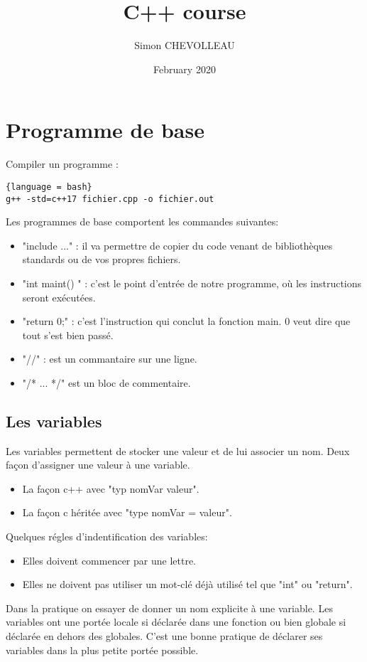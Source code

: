 \documentclass{article}
\title{C++ course}
\author{Simon CHEVOLLEAU }
\date{February 2020}
\begin{document}
\maketitle
\tableofcontents



\section{Programme de base}
Compiler un programme :
\begin{lstlisting}{language = bash}
g++ -std=c++17 fichier.cpp -o fichier.out
\end{lstlisting}

Les programmes de base comportent les commandes suivantes:
\begin{itemize}
    \item "include ..." : il va permettre de copier du code venant de bibliothèques standards ou de vos propres fichiers.
    \item "int maint() {}" : c'est le point d'entrée de notre programme, où les instructions seront exécutées.
    \item "return 0;" : c'est l'instruction qui conclut la fonction main. 0 veut dire que tout s'est bien passé.
    \item "//" : est un commantaire sur une ligne.
    \item "/* ... */" est un bloc de commentaire.
\end{itemize}{}
\subsection{Les variables}
Les variables permettent de stocker une valeur et de lui associer un nom. Deux façon d'assigner une valeur à une variable.
\begin{itemize}
    \item La façon c++ avec "typ nomVar {valeur}".
    \item La façon c héritée avec "type nomVar = valeur".
\end{itemize}{}
Quelques régles d'indentification des variables:
\begin{itemize}
    \item Elles doivent commencer par une lettre.
    \item Elles ne doivent pas utiliser un mot-clé déjà utilisé tel que "int" ou "return".
\end{itemize}{}
Dans la pratique on essayer de donner un nom explicite à une variable. Les variables ont une portée locale si déclarée dans une fonction ou bien globale si déclarée en dehors des globales. C'est une bonne pratique de déclarer ses variables dans la plus petite portée possible.
\end{document}
